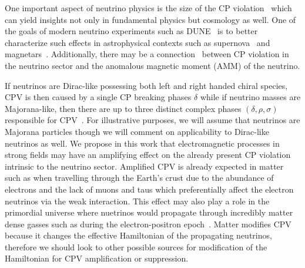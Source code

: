 One important aspect of neutrino physics is the size of the CP violation~\citep{wolfenstein1978oscillations,xing2001commutators,giunti2007fundamentals,huber2022snowmass} which can yield insights not only in fundamental physics but cosmology as well. One of the goals of modern neutrino experiments such as DUNE~\citep{abi2020long} is to better characterize such effects in astrophysical contexts such as supernova~\citep{abi2021supernova,abi2021prospects,athar2022status} and magnetars~\citep{lichkunov2019neutrino}. Additionally, there may be a connection~\citep{pehlivan2014neutrino,balaji2020cpa,balaji2020cpb} between CP violation in the neutrino sector and the anomalous magnetic moment (AMM) of the neutrino.

If neutrinos are Dirac-like possessing both left and right handed chiral species, CPV is then caused by a single CP breaking phases $\delta$ while if neutrino masses are Majorana-like, then there are up to three distinct complex phases $(\delta,\rho,\sigma)$ responsible for CPV~\citep{giunti2007fundamentals}. For illustrative purposes, we will assume that neutrinos are Majorana particles though we will comment on applicability to Dirac-like neutrinos as well. We propose in this work that electromagnetic processes in strong fields may have an amplifying effect on the already present CP violation intrinsic to the neutrino sector. Amplified CPV is already expected in matter~\citep{harrison2000cp} such as when travelling through the Earth's crust due to the abundance of electrons and the lack of muons and taus which preferentially affect the electron neutrinos via the weak interaction. This effect may also play a role in the primordial universe where nuetrinos would propagate through incredibly matter dense gasses such as during the electron-positron epoch~\citep{rafelski2023short}. Matter modifies CPV because it changes the effective Hamiltonian of the propagating neutrinos, therefore we should look to other possible sources for modification of the Hamiltonian for CPV amplification or suppression.

